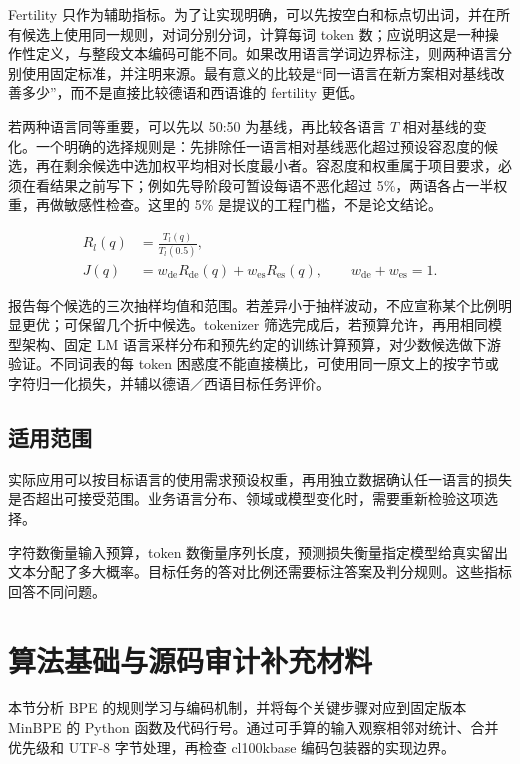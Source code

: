 \documentclass[11pt,a4paper]{article}
\newcommand{\BpeDocCodeInline}[1]{{\ttfamily #1}}
\newcommand{\BpeDocSection}[2]{\section{\texorpdfstring{#1}{#2}}}
\newcommand{\BpeDocSubsection}[2]{\subsection{\texorpdfstring{#1}{#2}}}
\begin{document}
Fertility 只作为辅助指标。为了让实现明确，可以先按空白和标点切出词，并在所有候选上使用同一规则，对词分别分词，计算每词 \BpeDocCodeInline{token} 数；应说明这是一种操作性定义，与整段文本编码可能不同。如果改用语言学词边界标注，则两种语言分别使用固定标准，并注明来源。最有意义的比较是“同一语言在新方案相对基线改善多少”，而不是直接比较德语和西语谁的 fertility 更低。


若两种语言同等重要，可以先以 50:50 为基线，再比较各语言 \(T\) 相对基线的变化。一个明确的选择规则是：先排除任一语言相对基线恶化超过预设容忍度的候选，再在剩余候选中选加权平均相对长度最小者。容忍度和权重属于项目要求，必须在看结果之前写下；例如先导阶段可暂设每语不恶化超过 5\%，两语各占一半权重，再做敏感性检查。这里的 5\% 是提议的工程门槛，不是论文结论。


\begin{equation}\label{eq:comparison-objective}
\begin{aligned}
R_l(q)&=\frac{T_l(q)}{T_l(0.5)},\\[4pt]
J(q)&=w_{\mathrm{de}}R_{\mathrm{de}}(q)+w_{\mathrm{es}}R_{\mathrm{es}}(q),\qquad w_{\mathrm{de}}+w_{\mathrm{es}}=1.
\end{aligned}
\end{equation}


报告每个候选的三次抽样均值和范围。若差异小于抽样波动，不应宣称某个比例明显更优；可保留几个折中候选。tokenizer 筛选完成后，若预算允许，再用相同模型架构、固定 LM 语言采样分布和预先约定的训练计算预算，对少数候选做下游验证。不同词表的每 \BpeDocCodeInline{token} 困惑度不能直接横比，可使用同一原文上的按字节或字符归一化损失，并辅以德语／西语目标任务评价。


\BpeDocSubsection{适用范围}{适用范围}


实际应用可以按目标语言的使用需求预设权重，再用独立数据确认任一语言的损失是否超出可接受范围。业务语言分布、领域或模型变化时，需要重新检验这项选择。


字符数衡量输入预算，\BpeDocCodeInline{token} 数衡量序列长度，预测损失衡量指定模型给真实留出文本分配了多大概率。目标任务的答对比例还需要标注答案及判分规则。这些指标回答不同问题。


\clearpage

\appendix


\BpeDocSection{算法基础与源码审计补充材料}{算法基础与源码审计补充材料}


本节分析 BPE 的规则学习与编码机制，并将每个关键步骤对应到固定版本 MinBPE 的 Python 函数及代码行号。通过可手算的输入观察相邻对统计、合并优先级和 UTF-8 字节处理，再检查 \BpeDocCodeInline{cl100k\relax\allowbreak{}base} 编码包装器的实现边界。
\end{document}
